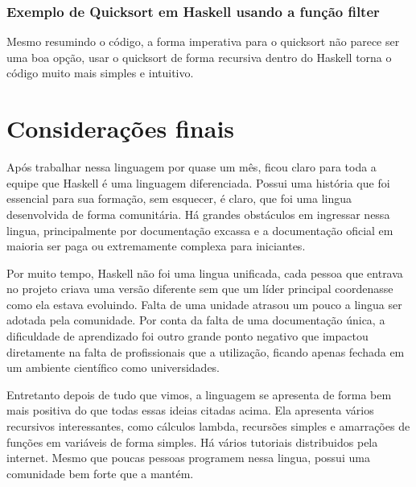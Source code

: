 \documentclass[
  12pt,				         %
  oneside,			       %
  a4paper,			       %
  english,		       	 %
  brazil,			      	 %
]{abntex2}
\begin{document}
      \subsection{Exemplo de Quicksort em Haskell usando a função filter} 

      

      Mesmo resumindo o código, a forma imperativa para o quicksort não parece ser uma boa opção, usar o quicksort de forma recursiva
      dentro do Haskell torna o código muito mais simples e intuitivo.

      \nocite{beginnersbook}
      \nocite{qastack}
      \nocite{haskellreport98}
      \nocite{progfuncional}

    \newpage


    \chapter*[Considerações finais]{Considerações finais}

    Após trabalhar nessa linguagem por quase um mês, ficou claro para toda a equipe que Haskell é uma linguagem diferenciada. Possui
    uma história que foi essencial para sua formação, sem esquecer, é claro, que foi uma lingua desenvolvida de forma comunitária.
    Há grandes obstáculos em ingressar nessa lingua, principalmente por documentação excassa e a documentação oficial em maioria ser
    paga ou extremamente complexa para iniciantes. 
    
    Por muito tempo, Haskell não foi uma lingua unificada, cada pessoa que entrava no projeto criava uma versão diferente sem que um líder
    principal coordenasse como ela estava evoluindo. Falta de uma unidade atrasou um pouco a lingua ser adotada pela comunidade.
    Por conta da falta de uma documentação única, a dificuldade de aprendizado foi outro grande ponto negativo que impactou diretamente
    na falta de profissionais que a utilização, ficando apenas fechada em um ambiente científico como universidades.

    Entretanto depois de tudo que vimos, a linguagem se apresenta de forma bem mais positiva do que todas essas ideias
    citadas acima. Ela apresenta vários recursivos interessantes, como cálculos lambda, recursões simples e amarrações de funções
    em variáveis de forma simples. Há vários tutoriais distribuidos pela internet. Mesmo que
    poucas pessoas programem nessa lingua, possui uma comunidade bem forte que a mantém.
\end{document}
